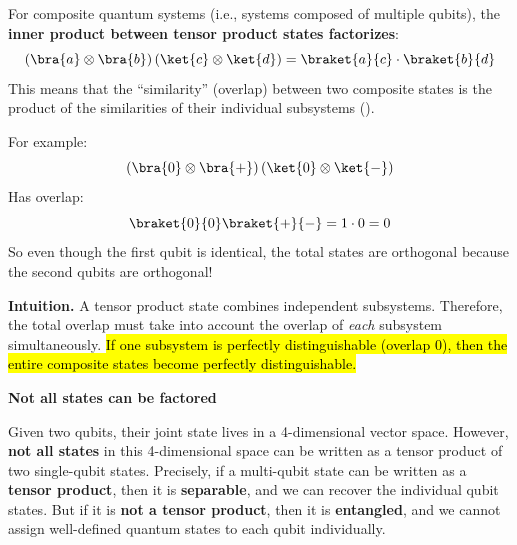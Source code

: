 \begin{remarkbox}
    For composite quantum systems (i.e., systems composed of multiple qubits), the \textbf{inner product between tensor product states factorizes}:
    \begin{equation}\label{eq:inner-product-tensor}
        \left(\bra{a} \otimes \bra{b}\right)\left(\ket{c} \otimes \ket{d}\right) = \braket{a}{c} \cdot \braket{b}{d}
    \end{equation}
    This means that the ``similarity'' (overlap) between two composite states is the product of the similarities of their individual subsystems ().

    \highspace
    For example:
    \begin{equation*}
        \left(\bra{0} \otimes \bra{+}\right)\left(\ket{0} \otimes \ket{-}\right)
    \end{equation*}
    Has overlap:
    \begin{equation*}
        \braket{0}{0} \braket{+}{-} = 1 \cdot 0 = 0
    \end{equation*}
    So even though the first qubit is identical, the total states are orthogonal because the second qubits are orthogonal!

    \highspace
    \textcolor{Green3}{ \textbf{Intuition.}} A tensor product state combines independent subsystems. Therefore, the total overlap must take into account the overlap of \emph{each} subsystem simultaneously. \hl{If one subsystem is perfectly distinguishable (overlap $0$), then the entire composite states become perfectly distinguishable.}
\end{remarkbox}

\begin{flushleft}
    \textcolor{Red2}{ \textbf{Not all states can be factored}}\label{ex:not-all-states-can-be-factored}
\end{flushleft}
Given two qubits, their joint state lives in a 4-dimensional vector space. However, \textbf{not all states} in this 4-dimensional space can be written as a tensor product of two single-qubit states. Precisely, if a multi-qubit state can be written as a \textbf{tensor product}, then it is \textbf{separable}, and we can recover the individual qubit states. But if it is \textbf{not a tensor product}, then it is \textbf{entangled}, and we cannot assign well-defined quantum states to each qubit individually.

